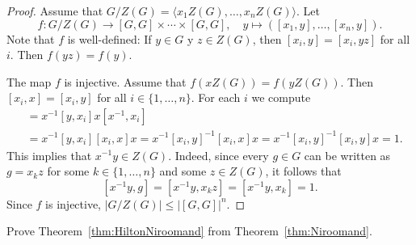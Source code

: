\begin{proof}
	Assume that $G/Z(G)=\langle x_1Z(G),\dots,x_nZ(G)\rangle$. Let 
	\[
		f\colon G/Z(G)\to [G,G]\times\cdots\times [G,G],
		\quad
		y\mapsto ([x_1,y],\dots,[x_n,y]).
	\]
	Note that $f$ is well-defined: If $y\in G$ y $z\in Z(G)$, then $[x_i,y]=[x_i,yz]$ for all $i$. 
	Then $f(yz)=f(y)$.
	 
	The map $f$ is injective. Assume that $f(xZ(G))=f(yZ(G))$. Then 
	$[x_i,x]=[x_i,y]$ for all $i\in\{1,\dots,n\}$. For each $i$ we compute  
	\begin{align*}
		[x^{-1}y,x_i] &= x^{-1}[y,x_i]x[x^{-1},x_i]\\
		&=x^{-1}[y,x_i][x_i,x]x=x^{-1}[x_i,y]^{-1}[x_i,x]x=x^{-1}[x_i,y]^{-1}[x_i,y]x=1.
	\end{align*}
	This implies that $x^{-1}y\in Z(G)$. Indeed, since  
	every $g\in G$ can be written as $g=x_kz$ for some $k\in\{1,\dots,n\}$ and some $z\in Z(G)$, 
	it follows that 
    \[
    [x^{-1}y,g]=[x^{-1}y,x_kz]=[x^{-1}y,x_k]=1.
    \]
    Since $f$ is injective, 
	$|G/Z(G)|\leq |[G,G]|^n$. 
\end{proof}

\begin{exercise}
Prove Theorem~\ref{thm:HiltonNiroomand} from Theorem~\ref{thm:Niroomand}. 
\end{exercise}



